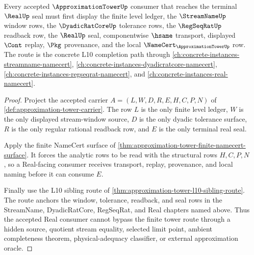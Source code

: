 \begin{theorem}
\label{thm:approximation-tower-real-consumer-route}
Every accepted $\ApproximationTowerUp$ consumer that reaches the terminal $\RealUp$ seal must first display the finite level ledger, the $\StreamNameUp$ window rows, the $\DyadicRatCoreUp$ tolerance rows, the $\RegSeqRatUp$ readback row, the $\RealUp$ seal, componentwise $\hsame$ transport, displayed $\Cont$ replay, $\Pkg$ provenance, and the local $\NameCert_{\ApproximationTowerUp}$ row. The route is the concrete L10 completion path through \autoref{ch:concrete-instances-streamname-namecert}, \autoref{ch:concrete-instances-dyadicratcore-namecert}, \autoref{ch:concrete-instances-regseqrat-namecert}, and \autoref{ch:concrete-instances-real-namecert}.
\end{theorem}
\begin{proof}
Project the accepted carrier $A=(L,W,D,R,E,H,C,P,N)$ of \autoref{def:approximation-tower-carrier}. The row $L$ is the only finite level ledger, $W$ is the only displayed stream-window source, $D$ is the only dyadic tolerance surface, $R$ is the only regular rational readback row, and $E$ is the only terminal real seal.

Apply the finite NameCert surface of \autoref{thm:approximation-tower-finite-namecert-surface}. It forces the analytic rows to be read with the structural rows $H,C,P,N$, so a Real-facing consumer receives transport, replay, provenance, and local naming before it can consume $E$.

Finally use the L10 sibling route of \autoref{thm:approximation-tower-l10-sibling-route}. The route anchors the window, tolerance, readback, and seal rows in the StreamName, DyadicRatCore, RegSeqRat, and Real chapters named above. Thus the accepted Real consumer cannot bypass the finite tower route through a hidden source, quotient stream equality, selected limit point, ambient completeness theorem, physical-adequacy classifier, or external approximation oracle.
\end{proof}
